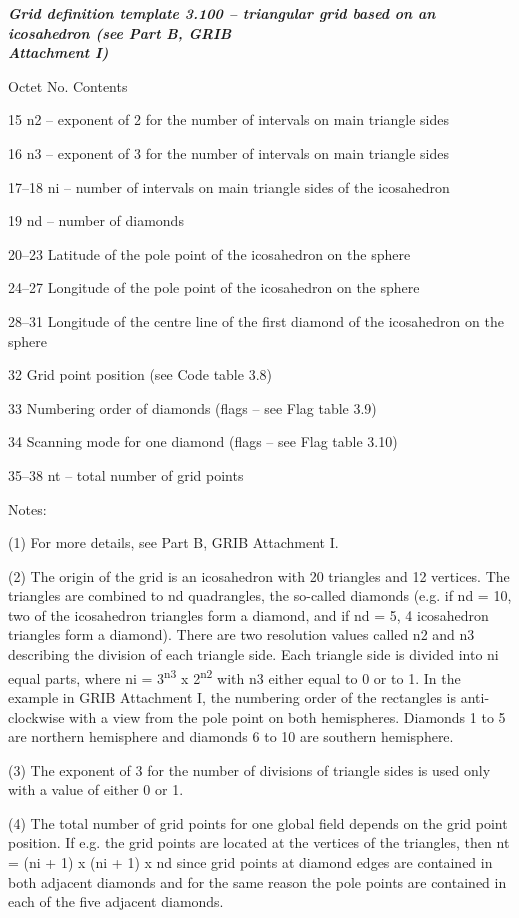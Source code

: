 \emph{\textbf{Grid definition template 3.100 -- triangular grid based on an icosahedron (see Part B, GRIB\\
Attachment I)}}

Octet No. Contents

15 n2 -- exponent of 2 for the number of intervals on main triangle sides

16 n3 -- exponent of 3 for the number of intervals on main triangle sides

17--18 ni -- number of intervals on main triangle sides of the icosahedron

19 nd -- number of diamonds

20--23 Latitude of the pole point of the icosahedron on the sphere

24--27 Longitude of the pole point of the icosahedron on the sphere

28--31 Longitude of the centre line of the first diamond of the icosahedron on the sphere

32 Grid point position (see Code table 3.8)

33 Numbering order of diamonds (flags -- see Flag table 3.9)

34 Scanning mode for one diamond (flags -- see Flag table 3.10)

35--38 nt -- total number of grid points

Notes:

(1) For more details, see Part B, GRIB Attachment I.

(2) The origin of the grid is an icosahedron with 20 triangles and 12 vertices. The triangles are combined to nd quadrangles, the so-called diamonds (e.g. if nd = 10, two of the icosahedron triangles form a diamond, and if nd = 5, 4 icosahedron triangles form a diamond). There are two resolution values called n2 and n3 describing the division of each triangle side. Each triangle side is divided into ni equal parts, where ni = 3\textsuperscript{n3} x 2\textsuperscript{n2} with n3 either equal to 0 or to 1. In the example in GRIB Attachment I, the numbering order of the rectangles is anti-clockwise with a view from the pole point on both hemispheres. Diamonds 1 to 5 are northern hemisphere and diamonds 6 to 10 are southern hemisphere.

(3) The exponent of 3 for the number of divisions of triangle sides is used only with a value of either 0 or 1.

(4) The total number of grid points for one global field depends on the grid point position. If e.g. the grid points are located at the vertices of the triangles, then nt = (ni + 1) x (ni + 1) x nd since grid points at diamond edges are contained in both adjacent diamonds and for the same reason the pole points are contained in each of the five adjacent diamonds.

